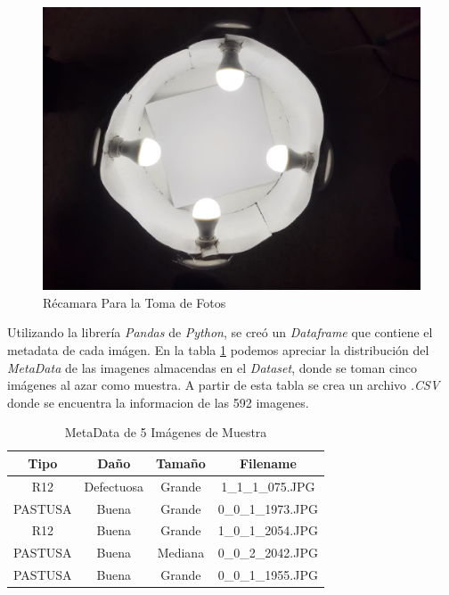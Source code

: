 	\begin{figure}[ht]
		\centering
		\includegraphics[scale=0.15]{Figs/Chamber.JPEG}
		\caption{Récamara Para la Toma de Fotos}
		\label{fig:chamber}
	\end{figure}
	
	Utilizando la librería \textit{Pandas} de \textit{Python}, se creó un \textit{Dataframe} que contiene el metadata de cada imágen. En la tabla \ref{table:metadata} podemos apreciar la distribución del \textit{MetaData} de las imagenes almacendas en el \textit{Dataset}, donde se toman cinco imágenes al azar como muestra. A partir de esta tabla se crea un archivo \textit{.CSV} donde se encuentra la informacion de las 592 imagenes.
	
	\begin{table}[ht]
		\centering
		\begin{tabular}{|c|c|c|c|}
			\hline
			Tipo & Daño & Tamaño & Filename \\
			\hline
			R12 & Defectuosa & Grande & 1\_1\_1\_075.JPG \\
			\hline
			PASTUSA & Buena & Grande & 0\_0\_1\_1973.JPG \\
			\hline
			R12 & Buena & Grande & 1\_0\_1\_2054.JPG \\
			\hline
			PASTUSA & Buena & Mediana & 0\_0\_2\_2042.JPG \\
			\hline
			PASTUSA & Buena & Grande & 0\_0\_1\_1955.JPG \\
			\hline
		\end{tabular}	
		\caption{MetaData de 5 Imágenes de Muestra}
		\label{table:metadata}
	\end{table}


